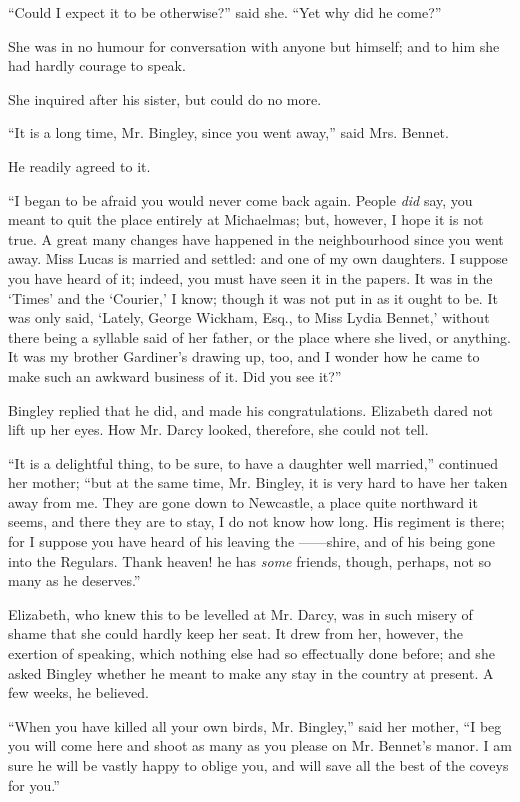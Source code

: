 ``Could I expect it to be otherwise?'' said she. ``Yet why did he come?''

She was in no humour for conversation with anyone but himself; and to him she had hardly courage to speak.

She inquired after his sister, but could do no more.

``It is a long time, Mr. Bingley, since you went away,'' said Mrs. Bennet.

He readily agreed to it.

``I began to be afraid you would never come back again. People \textit{did} say, you meant to quit the place entirely at Michaelmas; but, however, I hope it is not true. A great many changes have happened in the neighbourhood since you went away. Miss Lucas is married and settled: and one of my own daughters. I suppose you have heard of it; indeed, you must have seen it in the papers. It was in the `Times' and the `Courier,' I know; though it was not put in as it ought to be. It was only said, `Lately, George Wickham, Esq., to Miss Lydia Bennet,' without there being a syllable said of her father, or the place where she lived, or anything. It was my brother Gardiner's drawing up, too, and I wonder how he came to make such an awkward business of it. Did you see it?''

Bingley replied that he did, and made his congratulations. Elizabeth dared not lift up her eyes. How Mr. Darcy looked, therefore, she could not tell.

``It is a delightful thing, to be sure, to have a daughter well married,'' continued her mother; ``but at the same time, Mr. Bingley, it is very hard to have her taken away from me. They are gone down to Newcastle, a place quite northward it seems, and there they are to stay, I do not know how long. His regiment is there; for I suppose you have heard of his leaving the ------shire, and of his being gone into the Regulars. Thank heaven! he has \textit{some} friends, though, perhaps, not so many as he deserves.''

Elizabeth, who knew this to be levelled at Mr. Darcy, was in such misery of shame that she could hardly keep her seat. It drew from her, however, the exertion of speaking, which nothing else had so effectually done before; and she asked Bingley whether he meant to make any stay in the country at present. A few weeks, he believed.

``When you have killed all your own birds, Mr. Bingley,'' said her mother, ``I beg you will come here and shoot as many as you please on Mr. Bennet's manor. I am sure he will be vastly happy to oblige you, and will save all the best of the coveys for you.''

